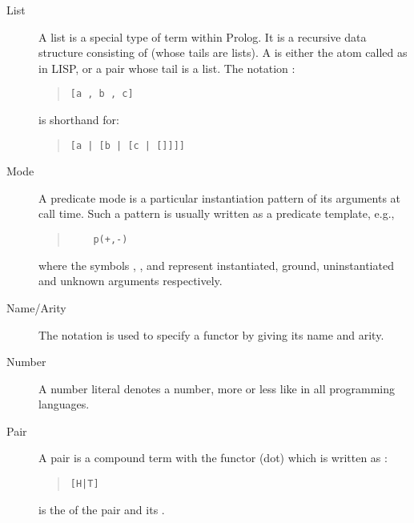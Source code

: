 \begin{description}
\item[List]
A list is a special type of term within Prolog. It is a
recursive data structure consisting of  (whose tails are lists).
A  is either the atom \notationidx{[]} called 
as in LISP,
or a pair whose tail is a list.
The notation :
\begin{quote}
\begin{verbatim}
[a , b , c]
\end{verbatim}
\end{quote}
is shorthand for:
\begin{quote}
\begin{verbatim}
[a | [b | [c | []]]]
\end{verbatim}
\end{quote}

\item[Mode]
A predicate mode is a particular instantiation pattern of its arguments
at call time.  Such a pattern is usually written as a predicate template, e.g.,
\begin{quote}
\begin{verbatim}
    p(+,-)
\end{verbatim}
\end{quote}
where the symbols \notation{+}, \notation{++}, \notation{-} and 
represent
instantiated, ground, uninstantiated and unknown arguments respectively.

\item[Name/Arity]
The notation  is used to specify a functor by giving its
name and arity.

\item[Number]
A number literal denotes a number, more or less like in all programming
languages.

\item[Pair]
A pair is a compound term with the functor  (dot)
which is written as :
\begin{quote}
\begin{verbatim}
[H|T]
\end{verbatim}
\end{quote}
 is the 
of the pair and  its
.



\end{description}
